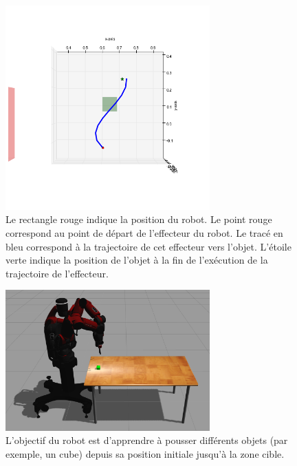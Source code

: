 \documentclass{llncs}
\begin{document}
\begin{figure}[ht]
  \begin{center}
  \includegraphics[width=0.7\textwidth]{figures/ns_trajectory.png}
  \caption{Le rectangle rouge indique la position du robot. Le point rouge correspond au point de départ de l'effecteur du robot. Le tracé en bleu correspond à la trajectoire de cet effecteur vers l'objet. L'étoile verte indique la position de l'objet à la fin de l'exécution de la trajectoire de l'effecteur.}
  \label{fig:ns_traj}
  \end{center}
\end{figure}

\begin{figure}[ht]
  \begin{center}
  \includegraphics[width=0.7\textwidth]{figures/Experiment_setup.png}
  \caption{L'objectif du robot est d'apprendre à pousser différents objets (par exemple, un cube) depuis sa position initiale jusqu'à la zone cible.}
  \label{fig7}
  \end{center}
\end{figure}
\end{document}
